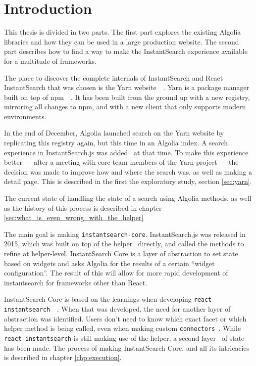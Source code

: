 
\chapter{Introduction} %
\label{chp:introduction}


This thesis is divided in two parts. The first part explores the existing Algolia libraries and how they can be used in a large production website. The second part describes how to find a way to make the InstantSearch experience available for a multitude of frameworks.

The place to discover the complete internals of InstantSearch and React InstantSearch that was chosen is the Yarn website~\cite{yarn-site}~. Yarn is a package manager built on top of npm~\cite{npm-github}~. It has been built from the ground up with a new registry, mirroring all changes to npm, and with a new client that only supports modern environments.

In the end of December, Algolia launched search on the Yarn website by replicating this registry again, but this time in an Algolia index. A search experience in InstantSearch.js was added~\cite{yarn-pr-add-algolia} at that time. To make this experience better --- after a meeting with core team members of the Yarn project --- the decision was made to improve how and where the search was, as well as making a detail page. This is described in the first the exploratory study, section \ref{sec:yarn}.

The current state of handling the state of a search using Algolia methods, as well as the history of this process is described in chapter \ref{sec:what_is_even_wrong_with_the_helper}

The main goal is making {\tt instantsearch-core}. InstantSearch.js was released in 2015, which was built on top of the helper~\cite{algolia-js-helper} directly, and called the methods to refine at helper-level. InstantSearch Core is a layer of abstraction to set state based on widgets and asks Algolia for the results of a certain ``widget configuration''. The result of this will allow for more rapid development of instantsearch for frameworks other than React.

InstantSearch Core is based on the learnings when developing {\tt react-instantsearch}~\cite{react-instantsearch}~.  When that was developed, the need for another layer of abstraction was identified. Users don't need to know which exact facet or which helper method is being called, even when making custom {\tt connectors}\cite{react-instantsearch-connectors}~. While {\tt react-instantsearch} is still making use of the helper, a second layer~\cite{react-instantsearch-search-state} of state has been made. The process of making InstantSearch Core, and all its intricacies is described in chapter \ref{chp:execution}.
